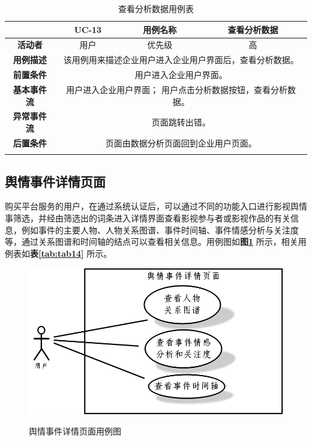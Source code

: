 \begin{longtable}[c]{c|ccc}
	\caption{查看分析数据用例表}
	\label{tab:tab13}\\
	\shline
	\multicolumn{1}{c|}{\textbf{用例编号}} & \multicolumn{1}{c|}{UC-13} & \multicolumn{1}{c|}{用例名称} &  查看分析数据\\ \hline
	\endhead
	\multicolumn{1}{c|}{\textbf{活动者}} & \multicolumn{1}{c|}{用户} & \multicolumn{1}{c|}{优先级} &高  \\ \hline
	\textbf{用例描述} & \multicolumn{3}{p{12cm}}{该用例用来描述企业用户进入企业用户界面后，查看分析数据。} \\ \hline
	\textbf{前置条件}& \multicolumn{3}{p{12cm}}{用户进入企业用户界面。} \\ \hline
	\textbf{基本事件流}& \multicolumn{3}{p{12cm}}{用户进入企业用户界面；\newline
	    用户点击分析数据按钮，查看分析数据。
	} \\ \hline
	\textbf{异常事件流}& \multicolumn{3}{p{12cm}}{页面跳转出错。
	} \\ \hline
	\textbf{后置条件}& \multicolumn{3}{p{12cm}}{页面由数据分析页面回到企业用户页面。} \\ \shline
\end{longtable}

\subsection{舆情事件详情页面}
购买平台服务的用户，在通过系统认证后，可以通过不同的功能入口进行影视舆情事筛选，并经由筛选出的词条进入详情界面查看影视参与者或影视作品的有关信息，例如事件的主要人物、人物关系图谱、事件时间轴、事件情感分析与关注度等，通过关系图谱和时间轴的结点可以查看相关信息。用例图如\textbf{图\ref{fig:fig5}} 所示，相关用例表如\textbf{表\ref{tab:tab14}} 所示。

\begin{figure}[!htb]
	\centering\label{fig:fig5}
	\includegraphics[scale=0.5]{image/f5.png}
	\caption{舆情事件详情页面用例图}
\end{figure}

